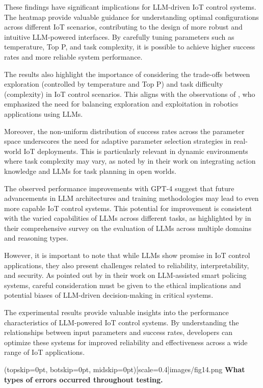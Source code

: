 \documentclass{ieeeaccess}
\begin{document}
These findings have significant implications for LLM-driven IoT control systems. The heatmap provide valuable guidance for understanding optimal configurations across different IoT scenarios, contributing to the design of more robust and intuitive LLM-powered interfaces. By carefully tuning parameters such as temperature, Top P, and task complexity, it is possible to achieve higher success rates and more reliable system performance.

The results also highlight the importance of considering the trade-offs between exploration (controlled by temperature and Top P) and task difficulty (complexity) in IoT control scenarios. This aligns with the observations of \citet{10500490}, who emphasized the need for balancing exploration and exploitation in robotics applications using LLMs.

Moreover, the non-uniform distribution of success rates across the parameter space underscores the need for adaptive parameter selection strategies in real-world IoT deployments. This is particularly relevant in dynamic environments where task complexity may vary, as noted by \citet{Singh2023} in their work on integrating action knowledge and LLMs for task planning in open worlds.

The observed performance improvements with GPT-4 suggest that future advancements in LLM architectures and training methodologies may lead to even more capable IoT control systems. This potential for improvement is consistent with the varied capabilities of LLMs across different tasks, as highlighted by \citet{Kumar2024} in their comprehensive survey on the evaluation of LLMs across multiple domains and reasoning types.

However, it is important to note that while LLMs show promise in IoT control applications, they also present challenges related to reliability, interpretability, and security. As pointed out by \citet{10538107} in their work on LLM-assisted smart policing systems, careful consideration must be given to the ethical implications and potential biases of LLM-driven decision-making in critical systems.

The experimental results provide valuable insights into the performance characteristics of LLM-powered IoT control systems. By understanding the relationships between input parameters and success rates, developers can optimize these systems for improved reliability and effectiveness across a wide range of IoT applications. 

\Figure[t!](topskip=0pt, botskip=0pt,
midskip=0pt)[scale=0.4]{{images/fig14.png}}
{ \textbf{What types of errors occurred throughout testing.}\label{fig14}}
\end{document}
